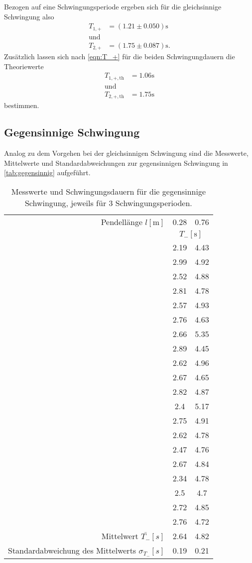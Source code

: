 \noindent
Bezogen auf eine Schwingungsperiode ergeben sich für die gleichsinnige Schwingung also
\begin{align}
  T_{1,+}&=(1.21 \pm 0.050) \si{\second}\\
  \text{und}& \nonumber\\
  T_{2,+}&=(1.75 \pm 0.087) \si{\second} \text{.}
\end{align}
\noindent
Zusätzlich lassen sich nach \autoref{eqn:T_+} für die beiden Schwingungdauern die Theoriewerte
\begin{align}
  T_{1,+,\text{th}}&=1.06 \si{\second}\\
  \text{und}& \nonumber\\
  T_{2,+,\text{th}}&=1.75 \si{\second} 
\end{align}
\noindent
bestimmen.

\subsection{Gegensinnige Schwingung}
\label{sec:gegensinnig}
Analog zu dem Vorgehen bei der gleichsinnigen Schwingung sind die Messwerte, Mittelwerte und Standardabweichungen zur gegensinnigen Schwingung in \autoref{tab:gegensinnig} aufgeführt.
\begin{table}[H]
  \centering
  \caption{Messwerte und Schwingungsdauern für die gegensinnige Schwingung, jeweils für 3 Schwingungsperioden.}
  \label{tab:gegensinnig}
  \begin{tabular}{r S S}
      \toprule
      Pendellänge $l [\si{\meter}]$ &
      0.28 &
      0.76 \\ 
      \cmidrule(lr){2-3}
      &  \\
      \midrule
      & 2.19 & 4.43 \\
 & 2.99 & 4.92 \\
 & 2.52 & 4.88 \\
 & 2.81 & 4.78 \\
 & 2.57 & 4.93 \\
 & 2.76 & 4.63 \\
 & 2.66 & 5.35 \\
 & 2.89 & 4.45 \\
 & 2.62 & 4.96 \\
 & 2.67 & 4.65 \\
 & 2.82 & 4.87 \\
 & 2.4  & 5.17 \\
 & 2.75 & 4.91 \\
 & 2.62 & 4.78 \\
 & 2.47 & 4.76 \\
 & 2.67 & 4.84 \\
 & 2.34 & 4.78 \\
 & 2.5  & 4.7  \\
 & 2.72 & 4.85 \\
 & 2.76 & 4.72 \\
      \midrule
      {Mittelwert} $\bar{T_-} [s]$                       & 2.64   & 4.82 \\
      {Standardabweichung des Mittelwerts} $\sigma_{T_-} [s]$ & 0.19 & 0.21 \\
      \bottomrule
  \end{tabular}
\end{table}
